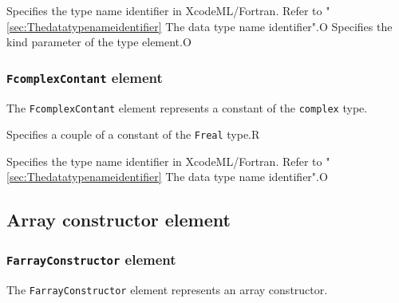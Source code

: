 \begin{XcodeMLAttributes}
{Specifies the type name identifier in XcodeML/Fortran.
 Refer to "\ref{sec:Thedatatypenameidentifier} The data type name identifier".}{O}
{Specifies the kind parameter of the type element.}{O}
\end{XcodeMLAttributes}


\subsubsection{ {\tt FcomplexContant} element}

The {\tt FcomplexContant} element represents a constant of the {\tt complex} type.


\begin{XcodeMLChildElements}
{Specifies a couple of a constant of the {\tt Freal} type.}{R}
\end{XcodeMLChildElements}

\begin{XcodeMLAttributes}
{Specifies the type name identifier in XcodeML/Fortran.
 Refer to "\ref{sec:Thedatatypenameidentifier} The data type name identifier".}{O}
\end{XcodeMLAttributes}


\subsection{Array constructor element}

\subsubsection{ {\tt FarrayConstructor} element}

The {\tt FarrayConstructor} element represents an array constructor.


